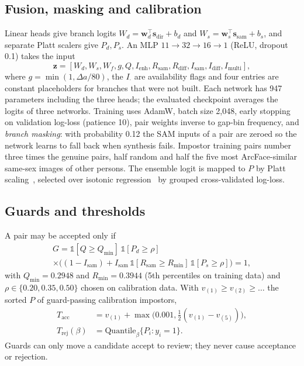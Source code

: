 \documentclass[journal]{IEEEtran}
\begin{document}
\subsection{Fusion, masking and calibration}
Linear heads give branch logits $W_d=\mathbf w_d^\top\mathbf s_\mathrm{dir}+b_d$ and $W_s=\mathbf w_s^\top\mathbf s_\mathrm{sam}+b_s$, and separate Platt scalers give $P_d,P_s$. An MLP $11\to32\to16\to1$ (ReLU, dropout 0.1) takes the input
\begin{equation}
\mathbf z=[W_d,W_s,W_f,g,Q,I_\mathrm{enh},R_\mathrm{sam},R_\mathrm{diff},I_\mathrm{sam},I_\mathrm{diff},I_\mathrm{multi}],
\end{equation}
where $g=\min(1,\Delta a/80)$, the $I_\cdot$ are availability flags and four entries are constant placeholders for branches that were not built. Each network has 947 parameters including the three heads; the evaluated checkpoint averages the logits of three networks. Training uses AdamW, batch size 2,048, early stopping on validation log-loss (patience 10), pair weights inverse to gap-bin frequency, and \emph{branch masking}: with probability 0.12 the SAM inputs of a pair are zeroed so the network learns to fall back when synthesis fails. Impostor training pairs number three times the genuine pairs, half random and half the five most ArcFace-similar same-sex images of other persons. The ensemble logit is mapped to $P$ by Platt scaling~\cite{platt1999}, selected over isotonic regression~\cite{zadrozny2002isotonic} by grouped cross-validated log-loss.

\subsection{Guards and thresholds}
A pair may be accepted only if
\begin{multline}
G=\mathbb 1[Q\ge Q_\mathrm{min}]\,\mathbb 1[P_d\ge\rho]\\
\times\big((1-I_\mathrm{sam})+I_\mathrm{sam}\,\mathbb 1[R_\mathrm{sam}\ge R_\mathrm{min}]\,\mathbb 1[P_s\ge\rho]\big)=1,
\end{multline}
with $Q_\mathrm{min}=0.2948$ and $R_\mathrm{min}=0.3944$ (5th percentiles on training data) and $\rho\in\{0.20,0.35,0.50\}$ chosen on calibration data. With $v_{(1)}\ge v_{(2)}\ge\dots$ the sorted $P$ of guard-passing calibration impostors,
\begin{align}
T_\mathrm{acc}&=v_{(1)}+\max\!\big(0.001,\tfrac12(v_{(1)}-v_{(5)})\big),\\
T_\mathrm{rej}(\beta)&=\mathrm{Quantile}_\beta\{P_i: y_i=1\}.
\end{align}
Guards can only move a candidate accept to review; they never cause acceptance or rejection.
\end{document}
